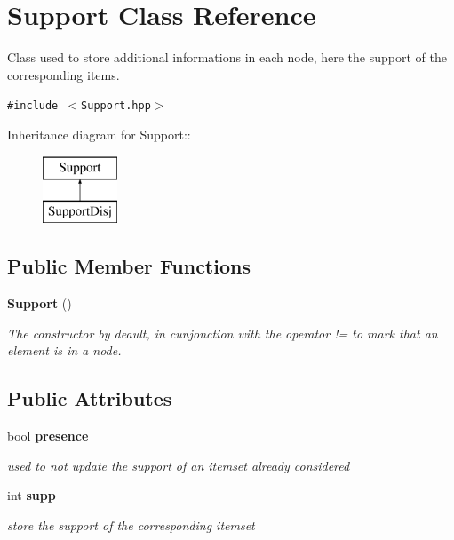 \section{Support Class Reference}
\label{class_support}
Class used to store additional informations in each node, here the support of the corresponding items.  


{\tt \#include $<$Support.hpp$>$}

Inheritance diagram for Support::\begin{figure}[H]
\begin{center}
\leavevmode
\includegraphics[height=2cm]{class_support}
\end{center}
\end{figure}
\subsection*{Public Member Functions}
\begin{CompactItemize}
\item 
{\bf Support} ()
\begin{CompactList}\small\item\em The constructor by deault, in cunjonction with the operator != to mark that an element is in a node. \item\end{CompactList}\end{CompactItemize}
\subsection*{Public Attributes}
\begin{CompactItemize}
\item 
bool {\bf presence}\label{class_support_1cb32d9c30dfd35099b9118e4234a5c2}

\begin{CompactList}\small\item\em used to not update the support of an itemset already considered \item\end{CompactList}\item 
int {\bf supp}\label{class_support_09e392dcc0f63feaa7b20513cfc8f630}

\begin{CompactList}\small\item\em store the support of the corresponding itemset \item\end{CompactList}\end{CompactItemize}


